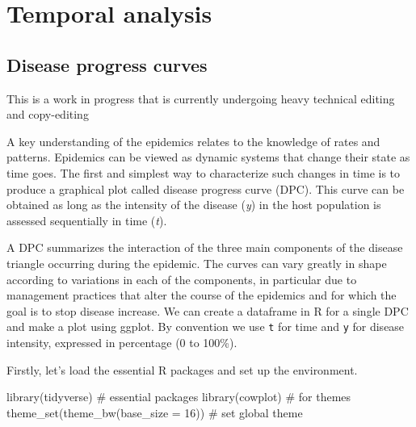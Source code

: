 \documentclass[
  letterpaper,
  DIV=11,
  numbers=noendperiod]{scrreprt}
\newenvironment{Shaded}{\begin{snugshade}}{\end{snugshade}}
\newcommand{\AttributeTok}[1]{\textcolor[rgb]{0.40,0.45,0.13}{#1}}
\newcommand{\CommentTok}[1]{\textcolor[rgb]{0.37,0.37,0.37}{#1}}
\newcommand{\DecValTok}[1]{\textcolor[rgb]{0.68,0.00,0.00}{#1}}
\newcommand{\FunctionTok}[1]{\textcolor[rgb]{0.28,0.35,0.67}{#1}}
\newcommand{\NormalTok}[1]{\textcolor[rgb]{0.00,0.23,0.31}{#1}}
\begin{document}
\part{Temporal analysis}

\hypertarget{disease-progress-curves}{%
\chapter{Disease progress curves}\label{disease-progress-curves}}

\begin{tcolorbox}[enhanced jigsaw, rightrule=.15mm, left=2mm, breakable, colframe=quarto-callout-note-color-frame, toprule=.15mm, leftrule=.75mm, bottomrule=.15mm, colback=white, arc=.35mm, opacityback=0]
\begin{minipage}[t]{5.5mm}
\textcolor{quarto-callout-note-color}{\faInfo}
\end{minipage}%
\begin{minipage}[t]{\textwidth - 5.5mm}
This is a work in progress that is currently undergoing heavy technical
editing and copy-editing\end{minipage}%
\end{tcolorbox}

A key understanding of the epidemics relates to the knowledge of rates
and patterns. Epidemics can be viewed as dynamic systems that change
their state as time goes. The first and simplest way to characterize
such changes in time is to produce a graphical plot called disease
progress curve (DPC). This curve can be obtained as long as the
intensity of the disease (\emph{y}) in the host population is assessed
sequentially in time (\emph{t}).

A DPC summarizes the interaction of the three main components of the
disease triangle occurring during the epidemic. The curves can vary
greatly in shape according to variations in each of the components, in
particular due to management practices that alter the course of the
epidemics and for which the goal is to stop disease increase. We can
create a dataframe in R for a single DPC and make a plot using ggplot.
By convention we use \texttt{t} for time and \texttt{y} for disease
intensity, expressed in percentage (0 to 100\%).

Firstly, let's load the essential R packages and set up the environment.

\begin{Shaded}
\begin{Highlighting}[]
\FunctionTok{library}\NormalTok{(tidyverse) }\CommentTok{\# essential packages }
\FunctionTok{library}\NormalTok{(cowplot) }\CommentTok{\# for themes }
\FunctionTok{theme\_set}\NormalTok{(}\FunctionTok{theme\_bw}\NormalTok{(}\AttributeTok{base\_size =} \DecValTok{16}\NormalTok{)) }\CommentTok{\# set global theme}
\end{Highlighting}
\end{Shaded}
\end{document}
